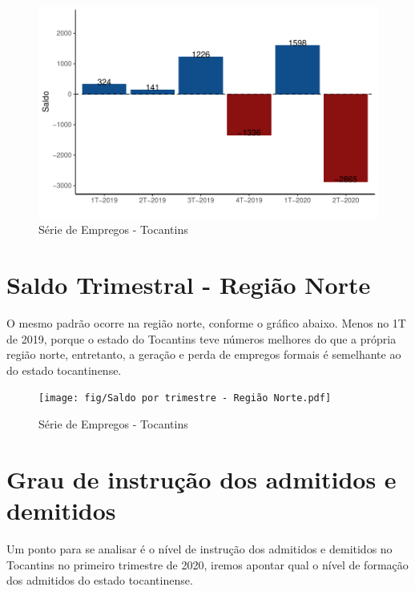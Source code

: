 \begin{figure}[h]
	\caption{Série de Empregos - Tocantins}
	\includegraphics[width=\linewidth]{fig/Saldo por trimestre - Tocantins.pdf}
\end{figure}

\section{Saldo Trimestral - Região Norte}
\par O mesmo padrão ocorre na região norte, conforme o gráfico abaixo. Menos no 1T de 2019, porque o estado do Tocantins teve números melhores do que a própria região norte, entretanto, a geração e perda de empregos formais é semelhante ao do estado tocantinense.

\begin{figure}[h]
	\caption{Série de Empregos - Tocantins}
	\texttt{[image: fig/Saldo por trimestre - Região Norte.pdf]}
\end{figure}

\section{Grau de instrução dos admitidos e demitidos}

\par Um ponto para se analisar é o nível de instrução dos admitidos e demitidos no Tocantins no primeiro trimestre de 2020, iremos apontar qual o nível de formação dos admitidos do estado tocantinense.

